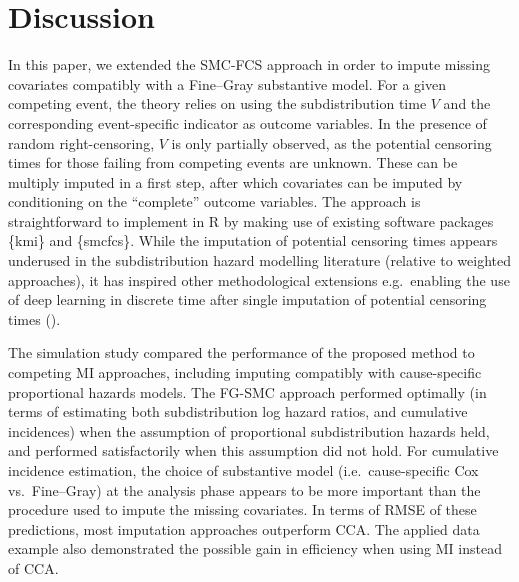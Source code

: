 \documentclass[
  letterpaper,
  DIV=11,
  numbers=noendperiod]{scrreprt}
\begin{document}
\section{Discussion}\label{sec-discussion}

In this paper, we extended the SMC-FCS approach in order to impute
missing covariates compatibly with a Fine--Gray substantive model. For a
given competing event, the theory relies on using the subdistribution
time \(V\) and the corresponding event-specific indicator as outcome
variables. In the presence of random right-censoring, \(V\) is only
partially observed, as the potential censoring times for those failing
from competing events are unknown. These can be multiply imputed in a
first step, after which covariates can be imputed by conditioning on the
``complete'' outcome variables. The approach is straightforward to
implement in R by making use of existing software packages \{kmi\} and
\{smcfcs\}. While the imputation of potential censoring times appears
underused in the subdistribution hazard modelling literature (relative
to weighted approaches), it has inspired other methodological extensions
e.g.~enabling the use of deep learning in discrete time after single
imputation of potential censoring times
().

The simulation study compared the performance of the proposed method to
competing MI approaches, including imputing compatibly with
cause-specific proportional hazards models. The FG-SMC approach
performed optimally (in terms of estimating both subdistribution log
hazard ratios, and cumulative incidences) when the assumption of
proportional subdistribution hazards held, and performed satisfactorily
when this assumption did not hold. For cumulative incidence estimation,
the choice of substantive model (i.e.~cause-specific Cox vs.~Fine--Gray)
at the analysis phase appears to be more important than the procedure
used to impute the missing covariates. In terms of RMSE of these
predictions, most imputation approaches outperform CCA. The applied data
example also demonstrated the possible gain in efficiency when using MI
instead of CCA.
\end{document}
